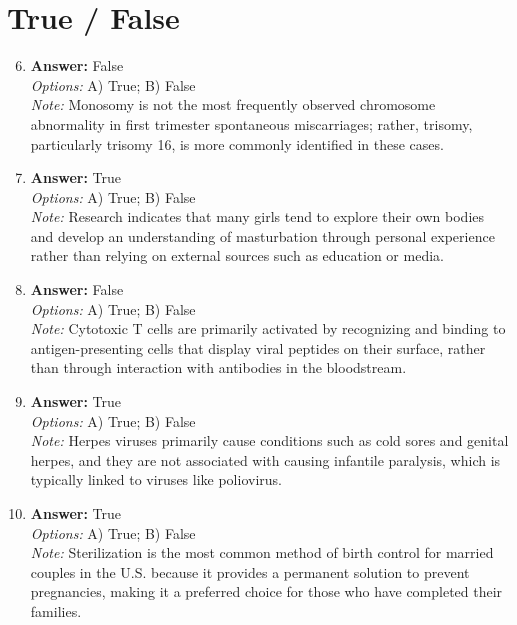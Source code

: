 \documentclass[12pt]{article}
\begin{document}
\section*{True / False}
\begin{enumerate}[label=\arabic*.]
\setcounter{enumi}{5}
\item \textbf{Answer:} False
\\ \textit{Options:} A) True; B) False
\\ \textit{Note:} Monosomy is not the most frequently observed chromosome abnormality in first trimester spontaneous miscarriages; rather, trisomy, particularly trisomy 16, is more commonly identified in these cases.
\item \textbf{Answer:} True
\\ \textit{Options:} A) True; B) False
\\ \textit{Note:} Research indicates that many girls tend to explore their own bodies and develop an understanding of masturbation through personal experience rather than relying on external sources such as education or media.
\item \textbf{Answer:} False
\\ \textit{Options:} A) True; B) False
\\ \textit{Note:} Cytotoxic T cells are primarily activated by recognizing and binding to antigen-presenting cells that display viral peptides on their surface, rather than through interaction with antibodies in the bloodstream.
\item \textbf{Answer:} True
\\ \textit{Options:} A) True; B) False
\\ \textit{Note:} Herpes viruses primarily cause conditions such as cold sores and genital herpes, and they are not associated with causing infantile paralysis, which is typically linked to viruses like poliovirus.
\item \textbf{Answer:} True
\\ \textit{Options:} A) True; B) False
\\ \textit{Note:} Sterilization is the most common method of birth control for married couples in the U.S. because it provides a permanent solution to prevent pregnancies, making it a preferred choice for those who have completed their families.
\end{enumerate}
\end{document}
